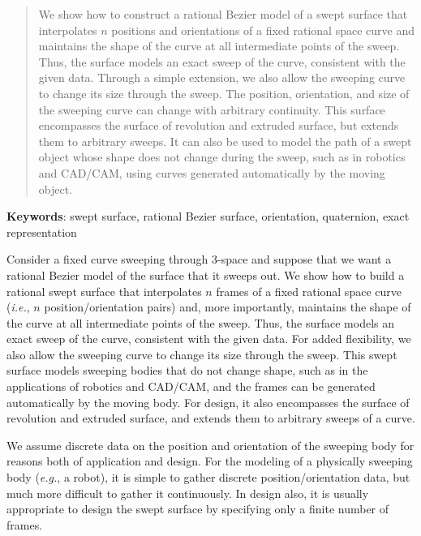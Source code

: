\maketitle
\thispagestyle{empty}
\begin{abstract}
We show how to construct a rational Bezier model of a swept
surface that interpolates
$n$ positions and orientations of a fixed rational space curve
and maintains the shape of the curve at all intermediate points
of the sweep.
Thus, the surface models
an exact sweep of the curve, consistent with the given data.
Through a simple extension, we also allow the sweeping curve to change
its size through the sweep.
The position, orientation, and size of the sweeping curve can change with
arbitrary continuity.
This surface
encompasses the surface of revolution and extruded surface, but extends
them to arbitrary sweeps.
It can also be used to model the path of a swept object whose shape does not
change during the sweep, such as in robotics and CAD/CAM, using curves generated
automatically by the moving object.
\end{abstract}

{\bf Keywords}: swept surface, rational Bezier surface, orientation, quaternion, exact representation

\clearpage

Consider a fixed curve sweeping through 3-space and suppose
that we want a rational Bezier model of the surface that it sweeps out.
We show how to build a rational swept surface that
interpolates $n$ frames of a fixed rational space curve 
({\em i.e.}, $n$ position/orientation pairs) 
and, more importantly, 
maintains the shape of the curve at all intermediate points of the sweep.
Thus, the surface models 
an exact sweep of the curve, consistent with the given data.
For added flexibility, we also allow the sweeping curve to change its
size through the sweep.
This swept surface models sweeping bodies that do not change shape,
such as in the applications of robotics and CAD/CAM,
and the frames can be generated automatically by the moving body.
For design, it also encompasses the surface of revolution 
and extruded surface, and extends them to arbitrary sweeps of a curve.

We assume discrete data on the position and orientation
of the sweeping body for reasons both of application and design.
For the modeling of a physically sweeping body ({\em e.g.}, a robot), 
it is simple to gather discrete position/orientation data, 
but much more difficult to gather it continuously.
In design also, it is usually appropriate to design the swept surface
by specifying only a finite number of frames.

